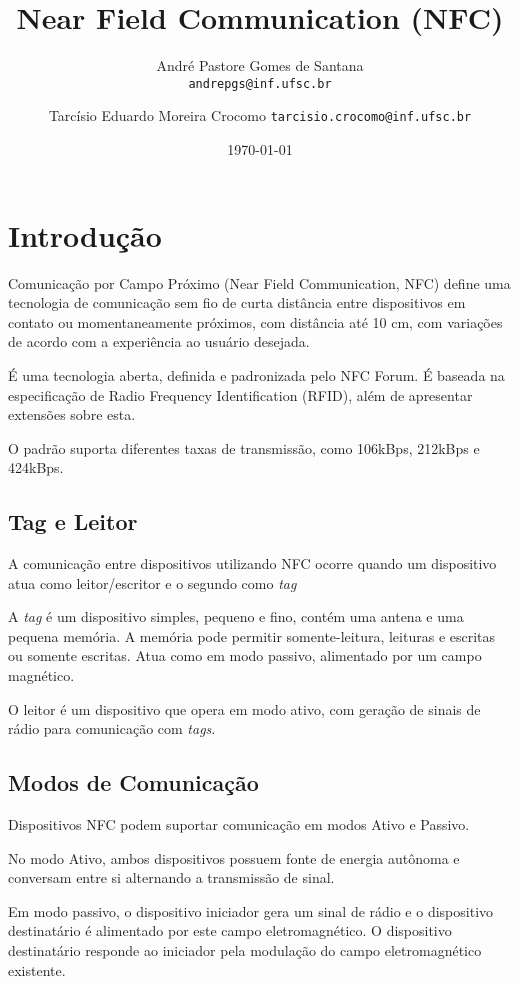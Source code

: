 \documentclass[a4paper,oneside]{article}
\title{Near Field Communication (NFC)}
\author{
    André Pastore Gomes de Santana\\
    \texttt{andrepgs@inf.ufsc.br}
    \and
    Tarcísio Eduardo Moreira Crocomo
    \texttt{tarcisio.crocomo@inf.ufsc.br}
}
\date{\today}
\begin{document}
\maketitle


\section{Introdução}
Comunicação por Campo Próximo (Near Field Communication, NFC) define uma tecnologia de comunicação sem fio de curta distância entre dispositivos em contato ou momentaneamente próximos, com distância até 10 cm, com variações de acordo com a experiência ao usuário desejada.

É uma tecnologia aberta, definida e padronizada pelo NFC Forum. É baseada na especificação de Radio Frequency Identification (RFID)\cite{iso14443}, além de apresentar extensões sobre esta.

O padrão suporta diferentes taxas de transmissão, como 106kBps, 212kBps e 424kBps.

\subsection{Tag e Leitor}
A comunicação entre dispositivos utilizando NFC ocorre quando um dispositivo atua como leitor/escritor e o segundo como \emph{tag}

A \emph{tag} é um dispositivo simples, pequeno e fino, contém uma antena e uma pequena memória. A memória pode permitir somente-leitura, leituras e escritas ou somente escritas. Atua como em modo passivo, alimentado por um campo magnético.

O leitor é um dispositivo que opera em modo ativo, com geração de sinais de rádio para comunicação com \emph{tags}. 

\subsection{Modos de Comunicação}
Dispositivos NFC podem suportar comunicação em modos Ativo e Passivo.

No modo Ativo, ambos dispositivos possuem fonte de energia autônoma e conversam entre si alternando a transmissão de sinal.

Em modo passivo, o dispositivo iniciador gera um sinal de rádio e o dispositivo destinatário é alimentado por este campo eletromagnético. O dispositivo destinatário responde ao iniciador pela modulação do campo eletromagnético existente.
\end{document}
